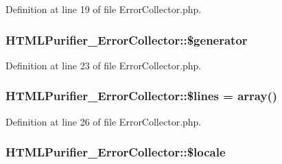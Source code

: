 Definition at line 19 of file Error\+Collector.\+php.

\hypertarget{classHTMLPurifier__ErrorCollector_a5fb7ece8bd0c13480e789bf881bf086f}{
\subsubsection[{\$generator}]{\setlength{\rightskip}{0pt plus 5cm}H\+T\+M\+L\+Purifier\+\_\+\+Error\+Collector\+::\$generator\hspace{0.3cm}{\ttfamily [protected]}}}\label{classHTMLPurifier__ErrorCollector_a5fb7ece8bd0c13480e789bf881bf086f}


Definition at line 23 of file Error\+Collector.\+php.

\hypertarget{classHTMLPurifier__ErrorCollector_a3af666ba56b9ddab14856a6e8b6156b6}{
\subsubsection[{\$lines}]{\setlength{\rightskip}{0pt plus 5cm}H\+T\+M\+L\+Purifier\+\_\+\+Error\+Collector\+::\$lines = array()\hspace{0.3cm}{\ttfamily [protected]}}}\label{classHTMLPurifier__ErrorCollector_a3af666ba56b9ddab14856a6e8b6156b6}


Definition at line 26 of file Error\+Collector.\+php.

\hypertarget{classHTMLPurifier__ErrorCollector_a014daeb6e9c79564095185154500e6a6}{
\subsubsection[{\$locale}]{\setlength{\rightskip}{0pt plus 5cm}H\+T\+M\+L\+Purifier\+\_\+\+Error\+Collector\+::\$locale\hspace{0.3cm}{\ttfamily [protected]}}}\label{classHTMLPurifier__ErrorCollector_a014daeb6e9c79564095185154500e6a6}


